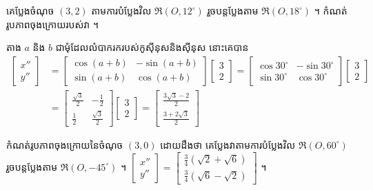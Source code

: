 \begin{example}[លំហាត់គំរូ ២]
គេប្លែងចំណុច $(3, 2)$ តាមការបំប្លែងវិល $\mathfrak{R}(O, 12^\circ)$ រួចបន្តប្លែងតាម $\mathfrak{R}(O, 18^\circ)$ ។ កំណត់រូបភាពចុងក្រោយរបស់វា ។
\end{example}
\ans
តាង $a$ និង $b$ ជាមុំដែលលំបាករករបស់កូស៊ីនុសនិងស៊ីនុស នោះគេបាន
\[ \begin{aligned} \begin{bmatrix} x''\\ y'' \end{bmatrix} &= \begin{bmatrix} \cos(a + b) & -\sin(a + b)\\ \sin(a + b) & \cos(a + b) \end{bmatrix}\begin{bmatrix} 3\\ 2 \end{bmatrix} = \begin{bmatrix} \cos 30^\circ & -\sin 30^\circ\\ \sin 30^\circ & \cos 30^\circ \end{bmatrix}\begin{bmatrix} 3\\ 2 \end{bmatrix}\\ &= \begin{bmatrix} \frac{\sqrt{3}}{2} & -\frac{1}{2}\\[3pt] \frac{1}{2} & \frac{\sqrt{3}}{2} \end{bmatrix}\begin{bmatrix} 3\\ 2 \end{bmatrix} = \begin{bmatrix} \frac{3\sqrt{3} - 2}{2}\\[3pt] \frac{3 + 2\sqrt{3}}{2} \end{bmatrix} \end{aligned} \]

\begin{pro}
កំណត់រូបភាពចុងក្រោយនៃចំណុច $(3, 0)$ ដោយដឹងថា គេប្លែងវាតាមការបំប្លែងវិល $\mathfrak{R}(O, 60^\circ)$ រួចបន្តប្លែងតាម $\mathfrak{R}(O, -45^\circ)$ ។
\ans
$\begin{bmatrix} x''\\ y'' \end{bmatrix} = \begin{bmatrix} \frac{3}{4}(\sqrt{2} + \sqrt{6})\\[3pt] \frac{3}{4}(\sqrt{6} - \sqrt{2}) \end{bmatrix}$ ។
\end{pro}

